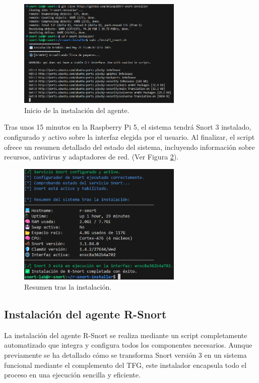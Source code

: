 \documentclass[11pt,a4paper,twoside]{report}
\begin{document}
\begin{figure}[H]
	\centering
	\includegraphics[width=0.7\textwidth]{install/2.png}
	\caption{Inicio de la instalación del agente.}
	\label{fig:inicio-instalacion-rsnort}
\end{figure}

Tras unos 15 minutos en la Raspberry Pi 5, el sistema tendrá Snort 3 instalado, configurado y activo sobre la interfaz elegida por el usuario. Al finalizar, el script ofrece un resumen detallado del estado del sistema, incluyendo información sobre recursos, antivirus y adaptadores de red. (Ver Figura \ref{fig:resumen-instalacion-rsnort}).

\begin{figure}[H]
	\centering
	\includegraphics[width=0.7\textwidth]{install/3.png}
	\caption{Resumen tras la instalación.}
	\label{fig:resumen-instalacion-rsnort}
\end{figure}


\subsection{Instalación del agente R-Snort}

La instalación del agente R-Snort se realiza mediante un script completamente automatizado que integra y configura todos los componentes necesarios. Aunque previamente se ha detallado cómo se transforma Snort versión 3 en un sistema funcional mediante el complemento del TFG, este instalador encapsula todo el proceso en una ejecución sencilla y eficiente.\newline
\end{document}
